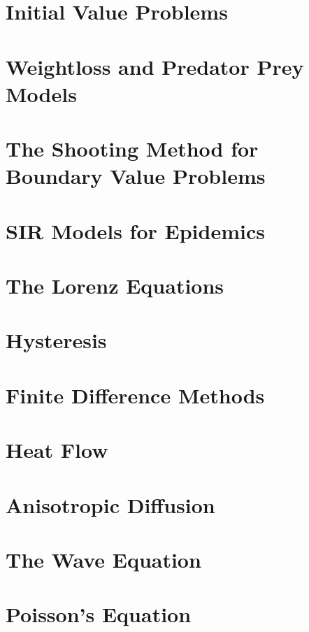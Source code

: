 
\section*{Initial Value Problems} %

\section*{Weightloss and Predator Prey Models} %

\section*{The Shooting Method for Boundary Value Problems} %

\section*{SIR Models for Epidemics} %

\section*{The Lorenz Equations} %

\section*{Hysteresis} %

\section*{Finite Difference Methods} %

\section*{Heat Flow} %

\section*{Anisotropic Diffusion} %

\section*{The Wave Equation} %

\section*{Poisson's Equation} %

